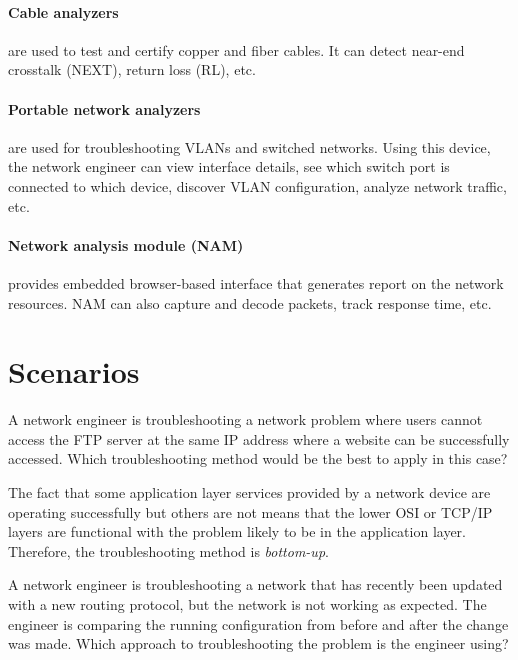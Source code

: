 \paragraph{Cable analyzers} are used to test and certify copper and fiber cables. It can detect near-end crosstalk (NEXT), return loss (RL), etc.

\paragraph{Portable network analyzers} are used for troubleshooting VLANs and switched networks. Using this device, the network engineer can view interface details, see which switch port is connected to which device, discover VLAN configuration, analyze network traffic, etc.

\paragraph{Network analysis module (NAM)} provides embedded browser-based interface that generates report on the network resources. NAM can also capture and decode packets, track response time, etc.

\section{Scenarios}

\begin{example}
A network engineer is troubleshooting a network problem where users cannot access the FTP server at the same IP address where a website can be successfully accessed. Which troubleshooting method would be the best to apply in this case? 
\end{example}

\begin{solution}
The fact that some application layer services provided by a network device are operating successfully but others are not means that the lower OSI or TCP/IP layers are functional with the problem likely to be in the application layer. Therefore, the troubleshooting method is \emph{bottom-up}.
\end{solution}

\begin{example}
A network engineer is troubleshooting a network that has recently been updated with a new routing protocol, but the network is not working as expected. The engineer is comparing the running configuration from before and after the change was made. Which approach to troubleshooting the problem is the engineer using? 
\end{example}

